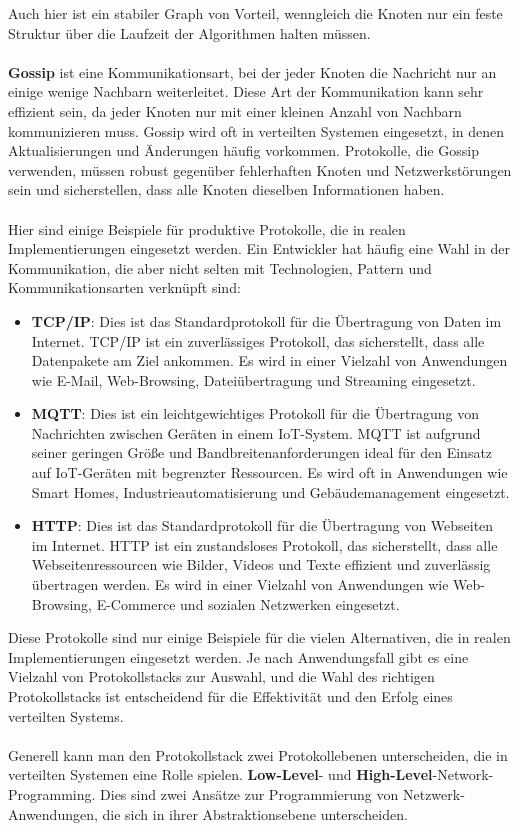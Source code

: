 \documentclass[../vs-script-first-v01.tex]{subfiles}
\begin{document}
Auch hier ist ein stabiler Graph von Vorteil, wenngleich die Knoten nur ein feste Struktur über die Laufzeit der Algorithmen halten müssen.
\\\\
\textbf{Gossip} ist eine Kommunikationsart, bei der jeder Knoten die Nachricht nur an einige wenige Nachbarn weiterleitet. Diese Art der Kommunikation kann sehr effizient sein, da jeder Knoten nur mit einer kleinen Anzahl von Nachbarn kommunizieren muss. Gossip wird oft in verteilten Systemen eingesetzt, in denen Aktualisierungen und Änderungen häufig vorkommen. Protokolle, die Gossip verwenden, müssen robust gegenüber fehlerhaften Knoten und Netzwerkstörungen sein und sicherstellen, dass alle Knoten dieselben Informationen haben.
\\\\
Hier sind einige Beispiele für produktive Protokolle, die in realen Implementierungen eingesetzt werden. Ein Entwickler hat häufig eine Wahl in der Kommunikation, die aber nicht selten mit Technologien, Pattern und Kommunikationsarten verknüpft sind:
 \begin{itemize}
\item \textbf{TCP/IP}: Dies ist das Standardprotokoll für die Übertragung von Daten im Internet. TCP/IP ist ein zuverlässiges Protokoll, das sicherstellt, dass alle Datenpakete am Ziel ankommen. Es wird in einer Vielzahl von Anwendungen wie E-Mail, Web-Browsing, Dateiübertragung und Streaming eingesetzt.

\item  \textbf{MQTT}: Dies ist ein leichtgewichtiges Protokoll für die Übertragung von Nachrichten zwischen Geräten in einem IoT-System. MQTT ist aufgrund seiner geringen Größe und Bandbreitenanforderungen ideal für den Einsatz auf IoT-Geräten mit begrenzter Ressourcen. Es wird oft in Anwendungen wie Smart Homes, Industrieautomatisierung und Gebäudemanagement eingesetzt.

\item \textbf{HTTP}: Dies ist das Standardprotokoll für die Übertragung von Webseiten im Internet. HTTP ist ein zustandsloses Protokoll, das sicherstellt, dass alle Webseitenressourcen wie Bilder, Videos und Texte effizient und zuverlässig übertragen werden. Es wird in einer Vielzahl von Anwendungen wie Web-Browsing, E-Commerce und sozialen Netzwerken eingesetzt.
 \end{itemize}
Diese Protokolle sind nur einige Beispiele für die vielen Alternativen, die in realen Implementierungen eingesetzt werden. Je nach Anwendungsfall gibt es eine Vielzahl von Protokollstacks zur Auswahl, und die Wahl des richtigen Protokollstacks ist entscheidend für die Effektivität und den Erfolg eines verteilten Systems.
\\\\
Generell kann man den Protokollstack zwei Protokollebenen unterscheiden, die in verteilten Systemen eine Rolle spielen. \textbf{Low-Level}- und \textbf{High-Level}-Network-Programming. Dies sind zwei Ansätze zur Programmierung von Netzwerk-Anwendungen, die sich in ihrer Abstraktionsebene unterscheiden.
\end{document}

